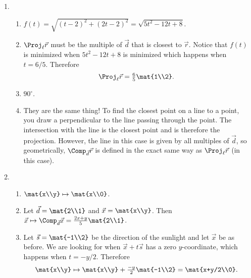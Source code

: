 \begin{enumerate}
\begin{enumerate}
\end{enumerate}

	\item \begin{enumerate}
			\item $f(t) = \sqrt{(t-2)^2+(2t-2)^2} = \sqrt{5t^2-12t+8}$.
			\item $\Proj_\ell \vec r$ must be the multiple of $\vec d$ that is
				closest to $\vec r$. Notice that $f(t)$ is minimized when
				$5t^2-12t+8$ is minimized which happens when $t=6/5$. Therefore
				\[
					\Proj_\ell \vec r = \tfrac{6}{5}\mat{1\\2}.
				\]
			\item $90^\circ$.
			\item They are the same thing! To find the closest point on a line
				to a point, you draw a perpendicular to the line passing through the point.
				The intersection with the line is the closest point and is therefore the projection.
				However, the line in this case is given by
				all multiples of $\vec d$, so geometrically,
				$\Comp_{\vec d}\vec r$ is defined in the exact same way as $\Proj_\ell \vec r$ (in this case).
	\end{enumerate}
		\item  \begin{enumerate}
				\item $\mat{x\\y}\mapsto \mat{x\\0}$.
			\item Let $\vec d=\mat{2\\1}$ and $\vec x=\mat{x\\y}$.
				Then $\vec x\mapsto \Comp_{\vec d}\vec x = \frac{2x+y}{5}\mat{2\\1}$.
			\item Let $\vec s=\mat{-1\\2}$ be the direction of the sunlight and let $\vec x$ be as before.
				We are looking for when $\vec x+t\vec s$ has a zero $y$-coordinate, which happens when
				$t=-y/2$. Therefore
				\[
					\mat{x\\y}\mapsto \mat{x\\y}+\tfrac{-y}{2}\mat{-1\\2} = \mat{x+y/2\\0}.
				\]
		\end{enumerate}

		\end{enumerate}
	
